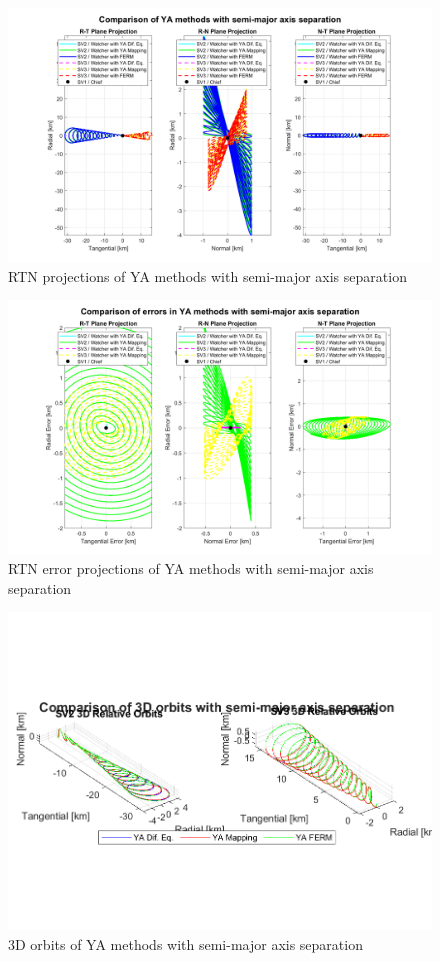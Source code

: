 \begin{figure}[H]
    \centering
    \includegraphics[width=0.7\linewidth]{sim/figures/PS3/RTN_projections_YA_comparison_2.png}
    \caption{RTN projections of YA methods with semi-major axis separation}
    \label{fig:RTN_comp_2}
\end{figure}
\begin{figure}[H]
    \centering
    \includegraphics[width=0.7\linewidth]{sim/figures/PS3/RTN_error_projections_YA_comparison_2.png}
    \caption{RTN error projections of YA methods with semi-major axis separation}
    \label{fig:RTN_error_comp_2}
\end{figure}
\begin{figure}[H]
    \centering
    \includegraphics[width=0.7\linewidth]{sim/figures/PS3/3D_YA_comparison_2.png}
    \caption{3D orbits of YA methods with semi-major axis separation}
    \label{fig:3D_orbits_YA_comp_2}
\end{figure}


